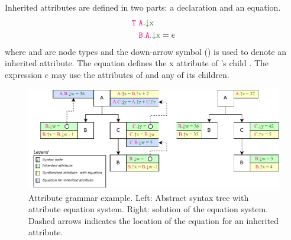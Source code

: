 Inherited attributes are defined in two parts: a declaration and an equation.
\begin{align*}
 \astnode{T} \ &\Ainh{A}{x} \\
 &\Ainhdef{B}{A}{x} = e
\end{align*}
where  and  are node types and the down-arrow symbol (\textcolor{ATGsym}{\mInh{}}) is used to denote an inherited attribute.
The equation defines the \textcolor{ATGsym}{x} attribute of 's child .
The expression $e$ may use the attributes of  and any of its children.


\begin{figure}
\centering
\includegraphics[width=1\textwidth]{kappa/img/AGExample.pdf}
    \caption{\label{fig:ragsExample} Attribute grammar example.
    Left: Abstract syntax tree with attribute equation system. Right: solution of the equation system. 
    Dashed arrows indicates the location of the equation for an inherited attribute.
    }
\end{figure}

